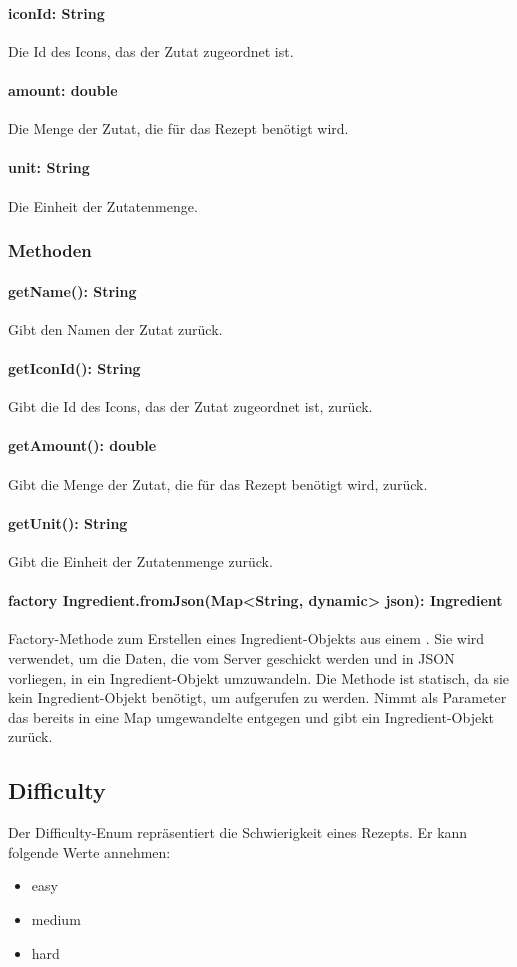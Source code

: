 \documentclass[parskip=full]{scrartcl}
\begin{document}
\paragraph{iconId: String}
Die Id des Icons, das der Zutat zugeordnet ist.
\paragraph{amount: double}
Die Menge der Zutat, die für das Rezept benötigt wird.
\paragraph{unit: String}
Die Einheit der Zutatenmenge.

\subsubsection{Methoden}
\paragraph{getName(): String}
Gibt den Namen der Zutat zurück.
\paragraph{getIconId(): String}
Gibt die Id des Icons, das der Zutat zugeordnet ist, zurück.
\paragraph{getAmount(): double}
Gibt die Menge der Zutat, die für das Rezept benötigt wird, zurück.
\paragraph{getUnit(): String}
Gibt die Einheit der Zutatenmenge zurück.
\paragraph{factory Ingredient.fromJson(Map<String, dynamic> json): Ingredient}
Factory-Methode zum Erstellen eines Ingredient-Objekts aus einem . Sie wird verwendet, um die Daten, die vom Server geschickt werden und in \Gls{JSON} vorliegen, in ein Ingredient-Objekt umzuwandeln. Die Methode ist statisch, da sie kein Ingredient-Objekt benötigt, um aufgerufen zu werden. Nimmt als Parameter das bereits in eine Map umgewandelte  entgegen und gibt ein Ingredient-Objekt zurück.
\subsection{Difficulty}
Der Difficulty-Enum repräsentiert die Schwierigkeit eines Rezepts. Er kann folgende Werte annehmen:
\begin{itemize}
    \item easy
    \item medium
    \item hard
\end{itemize}
\end{document}
